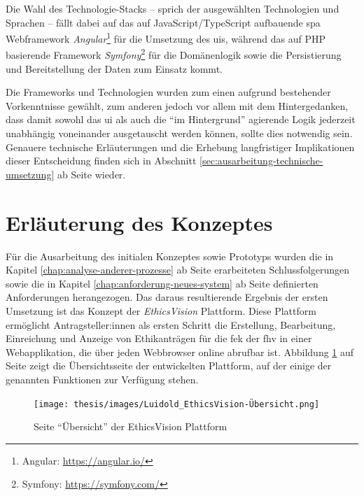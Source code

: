 \documentclass[a4paper,12pt,twoside]{scrreprt}
\begin{document}
\medskip

Die Wahl des Technologie-Stacks -- sprich der ausgewählten Technologien und Sprachen -- fällt dabei auf das auf JavaScript/TypeScript aufbauende \ac{spa} Webframework \textit{Angular}\footnote{Angular: \url{https://angular.io/}} für die Umsetzung des \aclp{ui}, während das auf PHP basierende Framework \textit{Symfony}\footnote{Symfony: \url{https://symfony.com/}} für die Domänenlogik sowie die Persistierung und Bereitstellung der Daten zum Einsatz kommt.

Die Frameworks und Technologien wurden zum einen aufgrund bestehender Vorkenntnisse gewählt, zum anderen jedoch vor allem mit dem Hintergedanken, dass damit sowohl das \ac{ui} als auch die \enquote{im Hintergrund} agierende Logik jederzeit unabhängig voneinander ausgetauscht werden können, sollte dies notwendig sein. Genauere technische Erläuterungen und die Erhebung langfristiger Implikationen dieser Entscheidung finden sich in Abschnitt \ref{sec:ausarbeitung-technische-umsetzung} ab Seite \pageref{sec:ausarbeitung-technische-umsetzung} wieder.

\section{Erläuterung des Konzeptes}
\label{sec:erläuterung-konzept}

Für die Ausarbeitung des initialen Konzeptes sowie Prototyps wurden die in Kapitel \ref{chap:analyse-anderer-prozesse} ab Seite \pageref{chap:analyse-anderer-prozesse} erarbeiteten Schlussfolgerungen sowie die in Kapitel \ref{chap:anforderung-neues-system} ab Seite \pageref{chap:anforderung-neues-system} definierten Anforderungen herangezogen. Das daraus resultierende Ergebnis der ersten Umsetzung ist das Konzept der \textit{EthicsVision} Plattform. Diese Plattform ermöglicht Antragsteller:innen als ersten Schritt die Erstellung, Bearbeitung, Einreichung und Anzeige von Ethikanträgen für die \acl{fek} der \acl{fhv} in einer Webapplikation, die über jeden Webbrowser online abrufbar ist. Abbildung \ref{fig:ethics-vision-übersicht} auf Seite \pageref{fig:ethics-vision-übersicht} zeigt die Übersichtsseite der entwickelten Plattform, auf der einige der genannten Funktionen zur Verfügung stehen.

\begin{figure}[ht]
    \centering
    \texttt{[image: thesis/images/Luidold\_EthicsVision-Übersicht.png]}
    \caption{Seite \enquote{Übersicht} der EthicsVision Plattform}
    \label{fig:ethics-vision-übersicht}
\end{figure}
\end{document}
